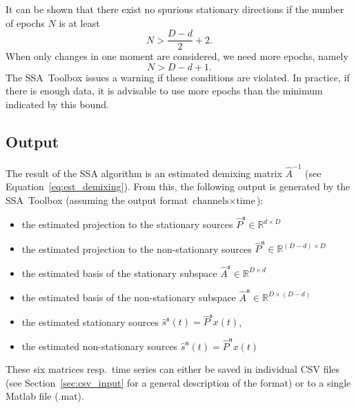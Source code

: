 \documentclass{article}
\newcommand{\R}{\ensuremath{\mathds{R}}}
\newcommand{\1}{\ensuremath{\mathds{1}}}
\newcommand{\s}{\ensuremath{\mathfrak{s}}}
\newcommand{\n}{\ensuremath{\mathfrak{n}}}
\newcommand{\0}{\ensuremath{0}}
\begin{document}
It can be shown \cite{PRL:SSA:2009} that there exist no spurious stationary directions
if the number of epochs $N$ is at least 
\begin{equation*}
	N > \frac{D-d}{2} + 2.
\end{equation*}
When only changes in one moment are considered, we need more epochs, namely
\begin{equation*}
	N > D-d + 1 .
\end{equation*}
The SSA~Toolbox issues a warning if these conditions are violated.
In practice, if there is enough data, it is advisable to use more epochs than the minimum
indicated by this bound. 

\subsection{Output}

The result of the SSA algorithm is an estimated demixing matrix $\hat{A}^{-1}$
(see Equation~\ref{eq:est_demixing}). From this, the following output
is generated by the SSA~Toolbox (assuming the output format $\text{channels} \times \text{time}$):
\begin{itemize}
	\item the estimated projection to the stationary sources $\hat{P}^\s \in \R^{d \times D}$ 
						
	\item the estimated projection to the non-stationary sources $\hat{P}^\n \in \R^{ (D-d) \times D}$ 

	\item the estimated basis of the stationary subspace $\hat{A}^\s \in \R^{D \times d}$
	
	\item the estimated basis of the non-stationary subspace $\hat{A}^\n \in \R^{D \times (D-d)}$

	\item the estimated stationary sources $\hat{s}^\s(t) = \hat{P}^\s {x}(t)$, 
	
	\item the estimated non-stationary sources $\hat{s}^\n(t) = \hat{P}^\n {x}(t) $
	
\end{itemize}
These six matrices resp.~time series can either be saved in individual CSV files 
(see Section~\ref{sec:csv_input} for a general description of the format) or to a single
Matlab file (.mat). 
\end{document}
